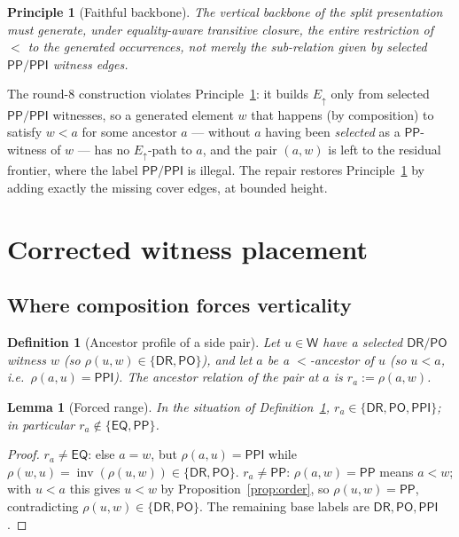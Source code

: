 \documentclass[11pt]{article}
\newtheorem{lemma}[theorem]{Lemma}
\newtheorem{definition}[theorem]{Definition}
\newtheorem{principle}[theorem]{Principle}
\newcommand{\EQ}{\mathsf{EQ}}
\newcommand{\DR}{\mathsf{DR}}
\newcommand{\PO}{\mathsf{PO}}
\newcommand{\PP}{\mathsf{PP}}
\newcommand{\PPI}{\mathsf{PPI}}
\newcommand{\Eup}{E_{\uparrow}}
\newcommand{\W}{\mathsf W}
\newcommand{\Inv}{\operatorname{inv}}
\begin{document}
\begin{principle}[Faithful backbone]\label{prin:backbone}
The vertical backbone of the split presentation must generate, under
equality-aware transitive closure, \emph{the entire restriction of $<$ to the
generated occurrences}, not merely the sub-relation given by selected
$\PP/\PPI$ witness edges.
\end{principle}

The round-8 construction violates Principle~\ref{prin:backbone}: it builds
$\Eup$ only from selected $\PP/\PPI$ witnesses, so a generated element $w$ that
happens (by composition) to satisfy $w<a$ for some ancestor $a$ --- without $a$
having been \emph{selected} as a $\PP$-witness of $w$ --- has no $\Eup$-path to
$a$, and the pair $(a,w)$ is left to the residual frontier, where the label
$\PP/\PPI$ is illegal.  The repair restores Principle~\ref{prin:backbone} by
adding exactly the missing cover edges, at bounded height.

\section{Corrected witness placement}

\subsection{Where composition forces verticality}

\begin{definition}[Ancestor profile of a side pair]\label{def:anc-profile}
Let $u\in\W$ have a selected $\DR/\PO$ witness $w$ (so $\rho(u,w)\in\{\DR,\PO\}$),
and let $a$ be a $<$-ancestor of $u$ (so $u<a$, i.e.\ $\rho(a,u)=\PPI$).  The
\emph{ancestor relation} of the pair at $a$ is $r_a:=\rho(a,w)$.
\end{definition}

\begin{lemma}[Forced range]\label{lem:forced-range}
In the situation of Definition~\ref{def:anc-profile}, $r_a\in\{\DR,\PO,\PPI\}$;
in particular $r_a\notin\{\EQ,\PP\}$.
\end{lemma}

\begin{proof}
$r_a\ne\EQ$: else $a=w$, but $\rho(a,u)=\PPI$ while $\rho(w,u)=\Inv(\rho(u,w))\in
\{\DR,\PO\}$.  $r_a\ne\PP$: $\rho(a,w)=\PP$ means $a<w$; with $u<a$ this gives
$u<w$ by Proposition~\ref{prop:order}, so $\rho(u,w)=\PP$, contradicting
$\rho(u,w)\in\{\DR,\PO\}$.  The remaining base labels are $\DR,\PO,\PPI$.
\end{proof}
\end{document}
